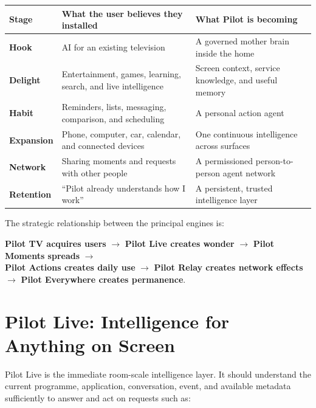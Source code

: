 \documentclass[11pt,a4paper]{article}
\begin{document}
\begin{table}[ht]
\centering
\small
\begin{tabularx}{\textwidth}{@{}>{\bfseries}p{19mm}XX@{}}
\toprule
Stage & What the user believes they installed & What Pilot is becoming\\
\midrule
Hook & AI for an existing television & A governed mother brain inside the home\\
Delight & Entertainment, games, learning, search, and live intelligence & Screen context, service knowledge, and useful memory\\
Habit & Reminders, lists, messaging, comparison, and scheduling & A personal action agent\\
Expansion & Phone, computer, car, calendar, and connected devices & One continuous intelligence across surfaces\\
Network & Sharing moments and requests with other people & A permissioned person-to-person agent network\\
Retention & ``Pilot already understands how I work'' & A persistent, trusted intelligence layer\\
\bottomrule
\end{tabularx}
\end{table}

The strategic relationship between the principal engines is:

\begin{center}
\textbf{Pilot TV acquires users} $\rightarrow$
\textbf{Pilot Live creates wonder} $\rightarrow$
\textbf{Pilot Moments spreads} $\rightarrow$\\[4pt]
\textbf{Pilot Actions creates daily use} $\rightarrow$
\textbf{Pilot Relay creates network effects} $\rightarrow$
\textbf{Pilot Everywhere creates permanence}.
\end{center}

\section{Pilot Live: Intelligence for Anything on Screen}

Pilot Live is the immediate room-scale intelligence layer.  It should
understand the current programme, application, conversation, event, and
available metadata sufficiently to answer and act on requests such as:
\end{document}
